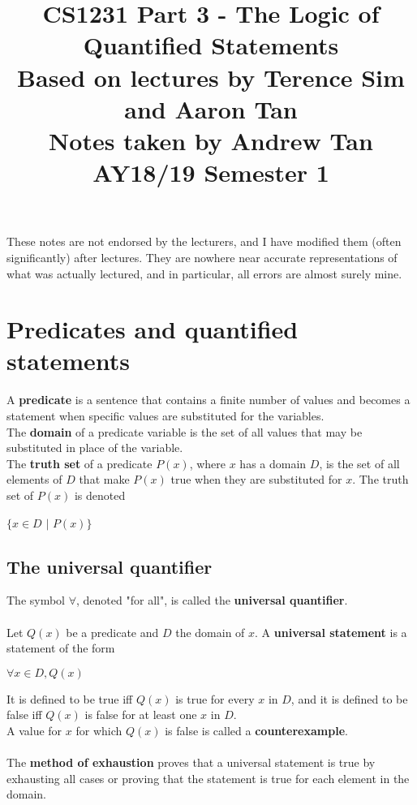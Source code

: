 \documentclass[a4paper]{article}
\title{%
	CS1231 Part 3 - The Logic of Quantified Statements  \\
	\large Based on lectures by Terence Sim and Aaron Tan
	\\ Notes taken by Andrew Tan
	\\ AY18/19 Semester 1
	\\ }
\author{}
\date{\vspace{-5ex}}
\begin{document}
\maketitle

\begin{center}\begin{minipage}[c]{0.9\textwidth}\centering\footnotesize These notes are not endorsed by the lecturers, and I have modified them (often significantly) after lectures. They are nowhere near accurate representations of what was actually lectured, and in particular, all errors are almost surely mine.\end{minipage}\end{center}

\section{Predicates and quantified statements}
A \textbf{predicate} is a sentence that contains a finite number of values and becomes a statement when specific values are substituted for the variables.\\
The \textbf{domain} of a predicate variable is the set of all values that may be substituted in place of the variable.\\
The \textbf{truth set} of a predicate $P(x)$, where $x$ has a domain $D$, is the set of all elements of $D$ that make $P(x)$ true when they are substituted for $x$. The truth set of $P(x)$ is denoted
\begin{center}
	$\{x \in D$  $|$  $P(x)\}$
\end{center}
\subsection{The universal quantifier}
The symbol $\forall$, denoted "for all", is called the \textbf{universal quantifier}.\\ \\
Let $Q(x)$ be a predicate and $D$ the domain of $x$. A \textbf{universal statement} is a statement of the form 
\begin{center}
	$\forall x \in D, Q(x)$
\end{center}
It is defined to be true iff $Q(x)$ is true for every $x$ in $D$, and it is defined to be false iff $Q(x)$ is false for at least one $x$ in $D$.\\
A value for $x$ for which $Q(x)$ is false is called a \textbf{counterexample}.\\ \\
The \textbf{method of exhaustion} proves that a universal statement is true by exhausting all cases or proving that the statement is true for each element in the domain.
\end{document}
